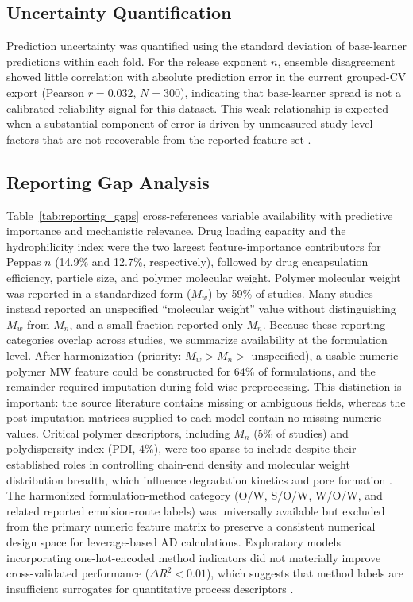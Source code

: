 \documentclass[preprint,12pt,authoryear]{elsarticle}
\begin{document}
\FloatBarrier

\subsection{Uncertainty Quantification}

Prediction uncertainty was quantified using the standard deviation of base-learner predictions within each fold. For the release exponent $n$, ensemble disagreement showed little correlation with absolute prediction error in the current grouped-CV export (Pearson $r = 0.032$, $N=300$), indicating that base-learner spread is not a calibrated reliability signal for this dataset. This weak relationship is expected when a substantial component of error is driven by unmeasured study-level factors that are not recoverable from the reported feature set \citep{Gramatica2007QSARValidation, Tropsha2010BestPracticesQSAR}.

\subsection{Reporting Gap Analysis}
\label{sec:reporting_gaps}

Table~\ref{tab:reporting_gaps} cross-references variable availability with predictive importance and mechanistic relevance. Drug loading capacity and the hydrophilicity index were the two largest feature-importance contributors for Peppas $n$ (14.9\% and 12.7\%, respectively), followed by drug encapsulation efficiency, particle size, and polymer molecular weight. Polymer molecular weight was reported in a standardized form ($M_w$) by 59\% of studies. Many studies instead reported an unspecified ``molecular weight'' value without distinguishing $M_w$ from $M_n$, and a small fraction reported only $M_n$. Because these reporting categories overlap across studies, we summarize availability at the formulation level. After harmonization (priority: $M_w > M_n >$ unspecified), a usable numeric polymer MW feature could be constructed for 64\% of formulations, and the remainder required imputation during fold-wise preprocessing. This distinction is important: the source literature contains missing or ambiguous fields, whereas the post-imputation matrices supplied to each model contain no missing numeric values. Critical polymer descriptors, including $M_n$ (5\% of studies) and polydispersity index (PDI, 4\%), were too sparse to include despite their established roles in controlling chain-end density and molecular weight distribution breadth, which influence degradation kinetics and pore formation \citep{AndersonShive1997PLGABiodeg, Fredenberg2011, MakadiaSiegel2011}. The harmonized formulation-method category (O/W, S/O/W, W/O/W, and related reported emulsion-route labels) was universally available but excluded from the primary numeric feature matrix to preserve a consistent numerical design space for leverage-based AD calculations. Exploratory models incorporating one-hot-encoded method indicators did not materially improve cross-validated performance ($\Delta R^2 < 0.01$), which suggests that method labels are insufficient surrogates for quantitative process descriptors \citep{Jain2000, KloseSiepmann2006Porosity}.
\end{document}
